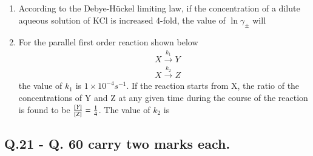 \documentclass[journal,12pt,onecolumn]{IEEEtran}
\theoremstyle{remark}
\begin{document}
\begin{enumerate}
\begin{enumerate}
        \hfill{}
    \end{enumerate}



\item According to the Debye-Hückel limiting law, if the concentration of a dilute aqueous solution of KCl is increased 4-fold, the value of $\ln \gamma_{\pm}$  will
    \begin{enumerate}
        \hfill{}
    \end{enumerate}



\item For the parallel first order reaction shown below
\begin{align*}
     &X \xrightarrow{k_1} Y\\
     &X \xrightarrow{k_2} Z
\end{align*}
    the value of $k_1$ is $1 
 \times 10^{-4} s^{-1}$. If the reaction starts from X, the ratio of the concentrations of Y and Z at any given time during the course of the reaction is found to be $\frac{{}\left[Y\right]}{{}\left[Z\right]} = \frac{1}{4}$.
 The value of $k_2$ is
    \begin{enumerate}
        \hfill{}
    \end{enumerate}
  \end{enumerate}  
  \vspace{1.5cm}
\begin{center}
\section*{Q.21 - Q. 60 carry two marks each.}

\end{center}
\end{document}
